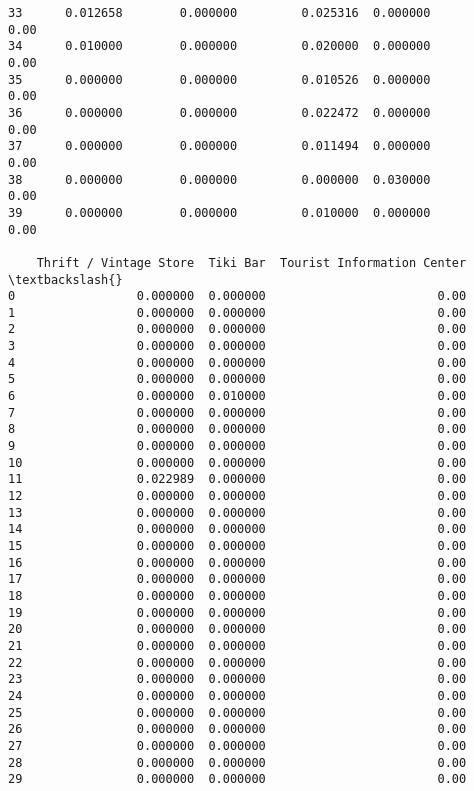 \documentclass[11pt]{article}
\begin{document}
\begin{tcolorbox}[breakable, size=fbox, boxrule=.5pt, pad at break*=1mm, opacityfill=0]
\begin{Verbatim}[commandchars=\\\{\}]
33      0.012658        0.000000         0.025316  0.000000              0.00
34      0.010000        0.000000         0.020000  0.000000              0.00
35      0.000000        0.000000         0.010526  0.000000              0.00
36      0.000000        0.000000         0.022472  0.000000              0.00
37      0.000000        0.000000         0.011494  0.000000              0.00
38      0.000000        0.000000         0.000000  0.030000              0.00
39      0.000000        0.000000         0.010000  0.000000              0.00

    Thrift / Vintage Store  Tiki Bar  Tourist Information Center  \textbackslash{}
0                 0.000000  0.000000                        0.00
1                 0.000000  0.000000                        0.00
2                 0.000000  0.000000                        0.00
3                 0.000000  0.000000                        0.00
4                 0.000000  0.000000                        0.00
5                 0.000000  0.000000                        0.00
6                 0.000000  0.010000                        0.00
7                 0.000000  0.000000                        0.00
8                 0.000000  0.000000                        0.00
9                 0.000000  0.000000                        0.00
10                0.000000  0.000000                        0.00
11                0.022989  0.000000                        0.00
12                0.000000  0.000000                        0.00
13                0.000000  0.000000                        0.00
14                0.000000  0.000000                        0.00
15                0.000000  0.000000                        0.00
16                0.000000  0.000000                        0.00
17                0.000000  0.000000                        0.00
18                0.000000  0.000000                        0.00
19                0.000000  0.000000                        0.00
20                0.000000  0.000000                        0.00
21                0.000000  0.000000                        0.00
22                0.000000  0.000000                        0.00
23                0.000000  0.000000                        0.00
24                0.000000  0.000000                        0.00
25                0.000000  0.000000                        0.00
26                0.000000  0.000000                        0.00
27                0.000000  0.000000                        0.00
28                0.000000  0.000000                        0.00
29                0.000000  0.000000                        0.00

\end{Verbatim}
\end{tcolorbox}
\end{document}
